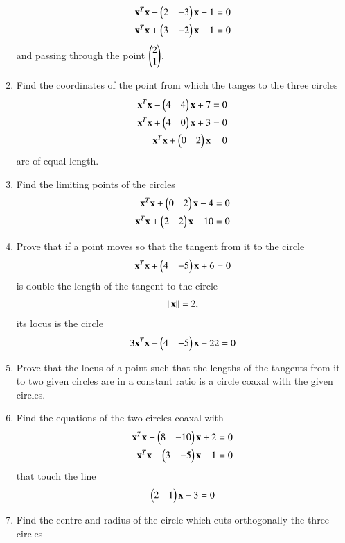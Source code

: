 \begin{enumerate}[label=\arabic*.,ref=\thesubsection.\theenumi]
\begin{align}
\mathbf{x}^T\mathbf{x}-\begin{pmatrix}2 & -3\end{pmatrix}\mathbf{x}-1 &= 0
\\
\mathbf{x}^T\mathbf{x}+\begin{pmatrix}3 & -2\end{pmatrix}\mathbf{x}-1 &= 0
\end{align}
and passing through the point $\begin{pmatrix}2\\1\end{pmatrix}$.
\item Find the coordinates of the point from which the tanges to the three circles
\begin{align}
\mathbf{x}^T\mathbf{x}-\begin{pmatrix}4 & 4\end{pmatrix}\mathbf{x}+7 = 0
\\
\mathbf{x}^T\mathbf{x}+\begin{pmatrix}4 & 0\end{pmatrix}\mathbf{x}+3 = 0
\\
\mathbf{x}^T\mathbf{x}+\begin{pmatrix}0 & 2\end{pmatrix}\mathbf{x} = 0
\end{align}
are of equal length.
\item Find the limiting points of the circles
\begin{align}
\mathbf{x}^T\mathbf{x}+\begin{pmatrix}0 & 2\end{pmatrix}\mathbf{x}-4 &= 0
\\
\mathbf{x}^T\mathbf{x}+\begin{pmatrix}2 & 2\end{pmatrix}\mathbf{x}-10 &= 0
\end{align}
\item Prove that if a point moves so that the tangent from it to the circle
\begin{align}
\mathbf{x}^T\mathbf{x}+\begin{pmatrix}4 & -5\end{pmatrix}\mathbf{x}+6 = 0
\end{align}
is double the length of the tangent to the circle
\begin{align}
\left\lVert\mathbf{x}\right\rVert = 2,
\end{align}
its locus is the circle
\begin{align}
3\mathbf{x}^T\mathbf{x}-\begin{pmatrix}4 & -5\end{pmatrix}\mathbf{x}-22 = 0
\end{align}
\item Prove that the locus of a point such that the lengths of the tangents from it to two given circles are in a constant ratio is a circle
coaxal with the given circles.
\item Find the equations of the two circles coaxal with
\begin{align}
\mathbf{x}^T\mathbf{x}-\begin{pmatrix}8 & -10\end{pmatrix}\mathbf{x}+2 = 0
\\
\mathbf{x}^T\mathbf{x}-\begin{pmatrix}3 & -5\end{pmatrix}\mathbf{x}-1 = 0
\end{align}
that touch the line
\begin{align}
\begin{pmatrix}2 & 1\end{pmatrix}\mathbf{x}-3 = 0
\end{align}
\item Find the centre and radius of the circle which cuts orthogonally the three circles
\begin{align}

\end{align}
\end{enumerate}

